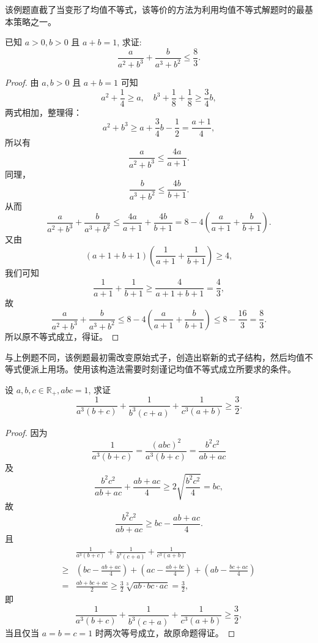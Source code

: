 \begin{analysis}
  该例题直截了当变形了均值不等式，该等价的方法为利用均值不等式解题时的最基本策略之一。
\end{analysis}


\begin{example}
  \parencite{贾静2017关于均值不等式的教学探究及应用}已知 $a>0, b>0$ 且 $a+b=1$, 求证: \[\frac{a}{a^{2}+b^{3}}+\frac{b}{a^{3}+b^{2}} \leq \frac{8}{3}.\]
\end{example}

\begin{proof}
  由 $a, b>0$ 且 $a+b=1$ 可知
  \[
  a^{2}+\frac{1}{4} \geq a, \quad b^{3}+\frac{1}{8}+\frac{1}{8} \geq \frac{3}{4} b,
  \]
  两式相加，整理得：
  \[
    a^{2}+b^{3} \geq a+\frac{3}{4} b-\frac{1}{2}=\frac{a+1}{4},
  \]
  所以有
  \[
    \frac{a}{a^{2}+b^{3}} \leq \frac{4 a}{a+1}.
  \]
  同理，
  \[
    \frac{b}{a^{3}+b^{2}} \leq \frac{4 b}{b+1}.
  \]
  从而
  \[
    \frac{a}{a^{2}+b^{3}}+\frac{b}{a^{3}+b^{2}} \leq \frac{4 a}{a+1}+\frac{4 b}{b+1}=8-4\left(\frac{a}{a+1}+\frac{b}{b+1}\right).
  \]
  又由
  \[
    (a+1+b+1)\left(\frac{1}{a+1}+\frac{1}{b+1}\right) \geq 4,
  \]
  我们可知
  \[
    \frac{1}{a+1}+\frac{1}{b+1} \geq \frac{4}{a+1+b+1}=\frac{4}{3},
  \]
  故
  \[
    \frac{a}{a^{2}+b^{3}}+\frac{b}{a^{3}+b^{2}} \leq 8-4\left(\frac{a}{a+1}+\frac{b}{b+1}\right) \leq 8-\frac{16}{3}=\frac{8}{3}.
  \] 所以原不等式成立，得证。
\end{proof}

\begin{analysis}
  与上例题不同，该例题最初需改变原始式子，创造出崭新的式子结构，然后均值不等式便派上用场。使用该构造法需要时刻谨记均值不等式成立所要求的条件。
\end{analysis}


\begin{example}
  设 $a, b, c \in \mathbb{R}_{+}, a b c=1$, 求证 \[\frac{1}{a^{3}(b+c)}+\frac{1}{b^{3}(c+a)}+\frac{1}{c^{3}(a+b)} \geq \frac{3}{2}.\]
\end{example}

\begin{proof}
  因为
  \[
    \frac{1}{a^{3}(b+c)}=\frac{(a b c)^{2}}{a^{3}(b+c)}=\frac{b^{2} c^{2}}{a b+a c}
  \]及
  \[
    \frac{b^{2} c^{2}}{a b+a c}+\frac{a b+a c}{4} \geq 2 \sqrt{\frac{b^{2} c^{2}}{4}}=b c,
  \]故
  \[
    \frac{b^{2} c^{2}}{a b+a c} \geq b c-\frac{a b+a c}{4}.
  \]且
  \begin{align*} 
    & \frac{1}{a^{3}(b+c)}+\frac{1}{b^{3}(c+a)}+\frac{1}{c^{3}(a+b)} \\ 
    \geq &\left(b c-\frac{a b+a c}{4}\right)+\left(a c-\frac{a b+b c}{4}\right)+\left(a b-\frac{b c+a c}{4}\right) \\ 
    =& \frac{a b+b c+a c}{2} \geq \frac{3}{2} \sqrt[3]{a b \cdot b c \cdot a c}=\frac{3}{2} ,
  \end{align*}
  即
  \[
    \frac{1}{a^{3}(b+c)}+\frac{1}{b^{3}(c+a)}+\frac{1}{c^{3}(a+b)} \geq \frac{3}{2},
  \]
  当且仅当 $a=b=c=1$ 时两次等号成立，故原命题得证。
\end{proof}

